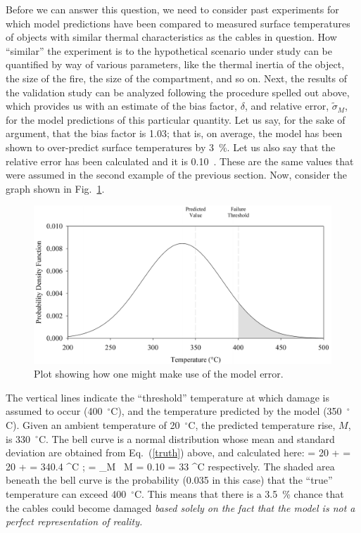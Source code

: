 Before we can answer this question, we need to consider past experiments for which model predictions have been compared to measured surface temperatures of objects
with similar thermal characteristics as the cables in question. How ``similar'' the experiment is to the hypothetical scenario under study can be quantified by way of
various parameters, like the thermal inertia of the object, the size of the fire, the size of the compartment, and so on. Next, the results of the validation study can be
analyzed following the procedure spelled out above, which provides us with an estimate of the bias factor, $\delta$, and relative error, $\tilde{\sigma}_M$, for the model
predictions of this particular quantity. Let us say, for the sake of argument, that the bias factor is 1.03; that is, on average, the model has been shown to over-predict
surface temperatures by 3~\%. Let us also say that the relative error has been calculated and it is 0.10~. These are the same values that were assumed in the second example
of the previous section.
Now, consider the graph shown in Fig.~\ref{bell_curve}.
\begin{figure}[t]
\begin{center}
\includegraphics[width=5.in]{FIGURES/bell_curve}
\end{center}
\caption[Demonstration of model error.]{Plot showing how one might make use of the model error.}
\label{bell_curve}
\end{figure}
The vertical lines indicate the ``threshold'' temperature at which damage is assumed to occur (400~$^\circ$C), and the temperature predicted by the
model (350~$^\circ$C). Given an ambient temperature of 20~$^\circ$C, the predicted temperature rise, $M$, is 330~$^\circ$C.
The bell curve is a normal distribution whose mean and standard deviation are obtained from Eq.~(\ref{truth}) above, and calculated here:
\be \mu = 20 +  = 20 +  = 340.4 \; ^\circ \hbox{C}  \quad ; \quad  \sigma = \widetilde{\sigma}_M \, M = 0.10  = 33 \; ^\circ \hbox{C}  \ee
respectively. The shaded area beneath the bell curve is the probability (0.035 in this case) that the ``true'' temperature can exceed 400~$^\circ$C.
This means that there is a 3.5~\% chance that the cables could
become damaged {\em based solely on the fact that the model is not a perfect representation of reality.}

